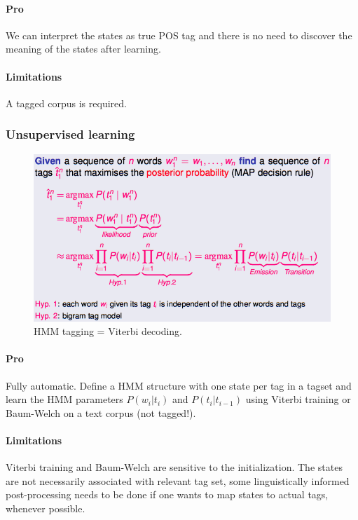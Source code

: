 \paragraph{Pro}

We can interpret the states as true POS tag and there is no need to discover the meaning of the states after learning.

\paragraph{Limitations}

A tagged corpus is required.

\subsubsection{Unsupervised learning}
\begin{figure}[H]
	\centering
	\includegraphics[scale=0.45]{images/37_viterbi.png}
 	\caption{HMM tagging = Viterbi decoding.}
\end{figure}
\paragraph{Pro}

Fully automatic. Define a HMM structure with one state per tag in a tagset and learn the HMM parameters $P(w_i|t_i)$ and $P(t_i|t_{i−1})$ using Viterbi training or Baum-Welch on a text corpus (not tagged!).

\paragraph{Limitations}

Viterbi training and Baum-Welch are sensitive to the initialization. The states are not necessarily associated with relevant tag set, some linguistically informed post-processing needs to be done if one wants to map states to actual tags, whenever possible.

